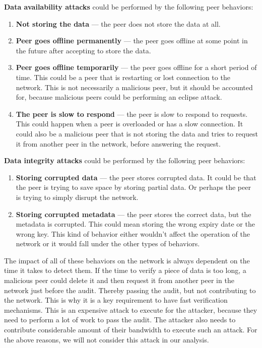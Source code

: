 \textbf{Data availability attacks} could be performed by the following peer behaviors:
\begin{enumerate}
    \item \textbf{Not storing the data} --- the peer does not store the data at all.
    \item \textbf{Peer goes offline permanently} --- the peer goes offline at some point in the future after accepting to store the data.
    \item \textbf{Peer goes offline temporarily} --- the peer goes offline for a short period of time.
        This could be a peer that is restarting or lost connection to the network.
        This is not necessarily a malicious peer, but it should be accounted for,
        because malicious peers could be performing an eclipse attack.
    \item \textbf{The peer is slow to respond} --- the peer is slow to respond to requests.
        This could happen when a peer is overloaded or has a slow connection.
        It could also be a malicious peer that is not storing the data and tries to request it
        from another peer in the network, before answering the request.
\end{enumerate}

\textbf{Data integrity attacks} could be performed by the following peer behaviors:
\begin{enumerate}
    \item \textbf{Storing corrupted data} --- the peer stores corrupted data.
        It could be that the peer is trying to save space by storing partial data.
        Or perhaps the peer is trying to simply disrupt the network.
    \item \textbf{Storing corrupted metadata} --- the peer stores the correct data, but the metadata is corrupted.
        This could mean storing the wrong expiry date or the wrong key.
        This kind of behavior either wouldn't affect the operation of the network or it would fall
        under the other types of behaviors.
\end{enumerate}

The impact of all of these behaviors on the network is always dependent on the time it takes to detect them.
If the time to verify a piece of data is too long, a malicious peer could delete it and then
request it from another peer in the network just before the audit.
Thereby passing the audit, but not contributing to the network.
This is why it is a key requirement to have fast verification mechanisms.
This is an expensive attack to execute for the attacker, because they need to perform a lot of
work to pass the audit.
The attacker also needs to contribute considerable amount of their bandwidth to execute such an attack.
For the above reasons, we will not consider this attack in our analysis.

